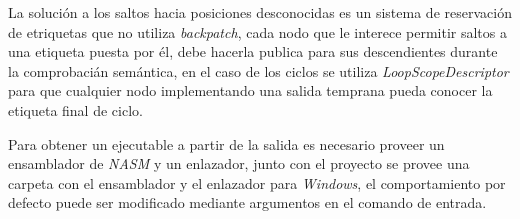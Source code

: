 \documentclass[a4paper,10pt]{article}
\begin{document}
		La solución a los saltos hacia posiciones desconocidas es un sistema de reservación de etriquetas que no utiliza \textit{backpatch}, cada nodo que le interece permitir saltos a una etiqueta puesta por él, debe hacerla publica para sus descendientes durante la comprobacián semántica, en el caso de los ciclos se utiliza \textit{LoopScopeDescriptor} para que cualquier nodo implementando una salida temprana pueda conocer la etiqueta final de ciclo.
		
		Para obtener un ejecutable a partir de la salida es necesario proveer un ensamblador de \textit{NASM} y un enlazador, junto con el proyecto se provee una carpeta con el ensamblador y el enlazador para \textit{Windows}, el comportamiento por defecto puede ser modificado mediante argumentos en el comando de entrada.
		
	
	
\end{document}
